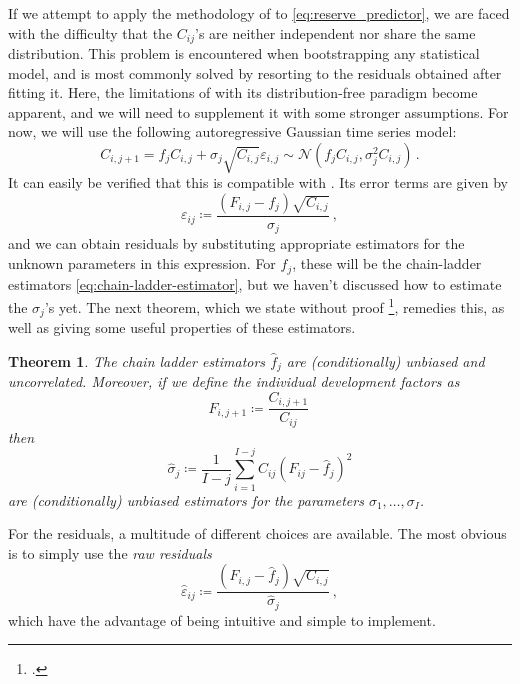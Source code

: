 \documentclass[a4paper]{book}
\theoremstyle{plain}
\newtheorem{theorem}{Theorem}
\begin{document}
If we attempt to apply the methodology of  to \eqref{eq:reserve_predictor}, we are faced with the difficulty that the $C_{ij}$'s are neither independent nor share the same distribution. This problem is encountered when bootstrapping any statistical model, and is most commonly solved by resorting to the residuals obtained after fitting it. Here, the limitations of  with its distribution-free paradigm become apparent, and we will need to supplement it with some stronger assumptions. For now, we will use the following autoregressive Gaussian time series model:
\begin{equation} \label{eq:time-series-model}
    C_{i, j+1} = f_j C_{i,j} + \sigma_j \sqrt{C_{i,j}} \varepsilon_{i, j} \sim \mathcal{N}(f_j C_{i, j}, \sigma_j^2 C_{i, j}) \,.
\end{equation}
It can easily be verified that this is compatible with . Its error terms are given by
\begin{equation}
    \varepsilon_{ij} \coloneqq \frac{(F_{i, j} - f_j)\sqrt{C_{i, j}}}{\sigma_j} \,,
\end{equation}
and we can obtain residuals by substituting appropriate estimators for the unknown parameters in this expression. For $f_j$, these will be the chain-ladder estimators \ref{eq:chain-ladder-estimator}, but we haven't discussed how to estimate the $\sigma_j$'s yet. The next theorem, which we state without proof \footcite[The relevant proofs can be found in][17 \psqq]{wuthrich:stochastic-reserving}, remedies this, as well as giving some useful properties of these estimators.
\begin{theorem}
    The chain ladder estimators $\hat{f}_j$ are (conditionally) unbiased and uncorrelated. Moreover, if we define the individual development factors as
    \begin{equation}
        F_{i, j + 1} \coloneqq \frac{C_{i, j + 1}}{C_{ij}} \,
    \end{equation}
    then
    \begin{equation}
        \hat{\sigma}_j \coloneqq \frac{1}{I-j}\sum_{i=1}^{I-j} C_{ij}\left( F_{ij} - \hat{f}_j \right)^2
    \end{equation}
    are (conditionally) unbiased estimators for the parameters $\sigma_1, \dots, 
    \sigma_I$.
\end{theorem}
For the residuals, a multitude of different choices are available. The most obvious is to simply use the \emph{raw residuals}
\begin{equation}
\hat{\varepsilon}_{ij} \coloneqq \frac{(F_{i, j} - \hat{f}_j)\sqrt{C_{i, j}}}{\hat{\sigma}_j} \,,
\end{equation}
which have the advantage of being intuitive and simple to implement.
\end{document}
